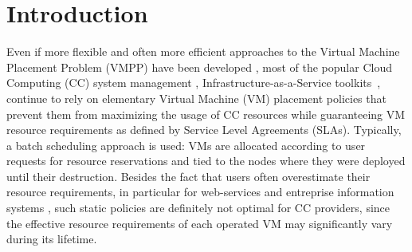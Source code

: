 \section{Introduction}
\label{sec:intro}


Even if more flexible and often more efficient approaches to the
Virtual Machine Placement Problem (VMPP) have been developed
, most of the popular Cloud Computing (CC) system
management \cite{cloudstack, opennebula, openstack}, \aka
Infrastructure-as-a-Service toolkits~\cite{moreno:2012}, continue to
rely on elementary Virtual Machine (VM) placement policies that
prevent them from maximizing the usage of CC resources while
guaranteeing VM resource requirements as defined by Service Level
Agreements (SLAs).
Typically, a batch scheduling approach is used: VMs are allocated
according to user requests for resource reservations and tied to
the nodes where they were deployed until their destruction. Besides
the fact that users often overestimate their resource requirements, in
particular for web-services and entreprise information systems
\cite{birke:nom2014, shen:ccgrid2015},
such static policies are definitely not optimal for CC providers,
since the effective resource requirements of each operated VM may
significantly vary during its lifetime.

